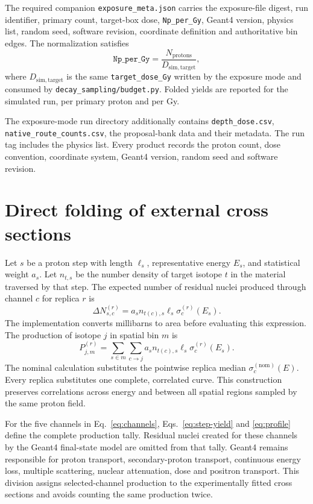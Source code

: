 \documentclass[11pt]{article}
\newcommand{\file}[1]{\texttt{#1}}
\begin{document}
The required companion \file{exposure\_meta.json} carries the exposure-file
digest, run identifier, primary count, target-box dose, \file{Np\_per\_Gy},
Geant4 version, physics list, random seed, software revision, coordinate
definition and authoritative bin edges.  The normalization satisfies
\begin{equation}
 \file{Np\_per\_Gy}=\frac{N_{\mathrm{protons}}}
 {D_{\mathrm{sim,target}}},
 \label{eq:np-per-gy}
\end{equation}
where $D_{\mathrm{sim,target}}$ is the same \file{target\_dose\_Gy} written by
the exposure mode and consumed by \file{decay\_sampling/budget.py}.  Folded yields are
reported for the simulated run, per primary proton and per Gy.

The exposure-mode run directory additionally contains
\file{depth\_dose.csv}, \file{native\_route\_counts.csv}, the proposal-bank
data and their metadata.  The run tag includes the physics list.  Every product
records the proton count, dose convention, coordinate system, Geant4 version,
random seed and software revision.

\section{Direct folding of external cross sections}

Let $s$ be a proton step with length $\ell_s$, representative energy $E_s$,
and statistical weight $a_s$.  Let $n_{t,s}$ be the number density of target
isotope $t$ in the material traversed by that step.  The expected number of
residual nuclei produced through channel $c$ for replica $r$ is
\begin{equation}
  \Delta N_{s,c}^{(r)}=
  a_s n_{t(c),s}\ell_s\sigma_c^{(r)}(E_s).
  \label{eq:step-yield}
\end{equation}
The implementation converts millibarns to area before evaluating this
expression.  The production of isotope $j$ in spatial bin $m$ is
\begin{equation}
  P_{j,m}^{(r)}=
  \sum_{s\in m}\sum_{c\rightarrow j}
  a_s n_{t(c),s}\ell_s\sigma_c^{(r)}(E_s).
  \label{eq:profile}
\end{equation}
The nominal calculation substitutes the pointwise replica median
$\sigma_c^{(\mathrm{nom})}(E)$.  Every replica substitutes one complete, correlated
curve.  This construction preserves correlations across energy and between
all spatial regions sampled by the same proton field.

For the five channels in Eq.~\eqref{eq:channels}, Eqs.~\eqref{eq:step-yield}
and \eqref{eq:profile} define the complete production tally.  Residual nuclei
created for these channels by the Geant4 final-state model are omitted from
that tally.  Geant4 remains responsible for proton transport, secondary-proton
transport, continuous energy loss, multiple scattering, nuclear attenuation,
dose and positron transport.  This division assigns selected-channel
production to the experimentally fitted cross sections and avoids counting the
same production twice.
\end{document}

